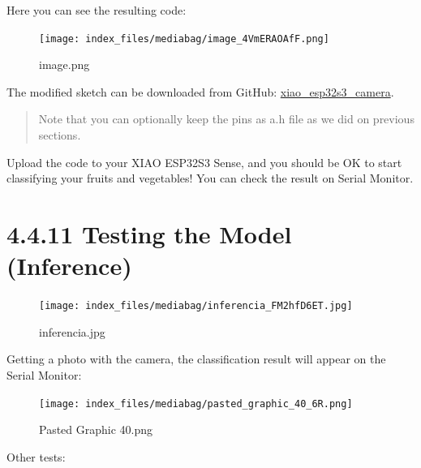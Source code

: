 \documentclass[
  letterpaper,
  DIV=11,
  numbers=noendperiod]{scrreprt}
\begin{document}
Here you can see the resulting code:

\begin{figure}[H]

{\centering \texttt{[image: index\_files/mediabag/image\_4VmERAOAfF.png]}

}

\caption{image.png}

\end{figure}

The modified sketch can be downloaded from GitHub:
\href{https://github.com/Mjrovai/XIAO-ESP32S3-Sense/tree/main/xiao_esp32s3_camera}{xiao\_esp32s3\_camera}.

\begin{quote}
Note that you can optionally keep the pins as a.h file as we did on
previous sections.
\end{quote}

Upload the code to your XIAO ESP32S3 Sense, and you should be OK to
start classifying your fruits and vegetables! You can check the result
on Serial Monitor.

\hypertarget{testing-the-model-inference}{%
\section*{4.4.11 Testing the Model
(Inference)}\label{testing-the-model-inference}}


\begin{figure}[H]

{\centering \texttt{[image: index\_files/mediabag/inferencia\_FM2hfD6ET.jpg]}

}

\caption{inferencia.jpg}

\end{figure}

Getting a photo with the camera, the classification result will appear
on the Serial Monitor:

\begin{figure}[H]

{\centering \texttt{[image: index\_files/mediabag/pasted\_graphic\_40\_6R.png]}

}

\caption{Pasted Graphic 40.png}

\end{figure}

Other tests:
\end{document}
